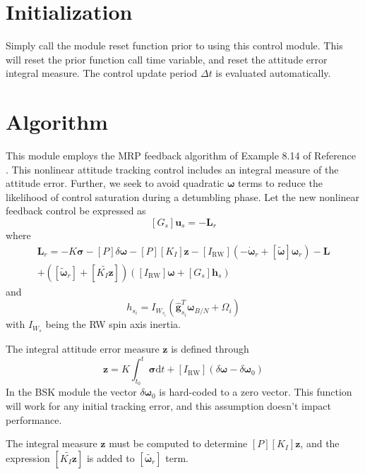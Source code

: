 \documentclass[]{BasiliskReportMemo}
\begin{document}
\section{Initialization}
Simply call the module reset function prior to using this control module.  This will reset the prior function call time variable, and reset the attitude error integral measure.  The control update period $\Delta t$ is evaluated automatically.  

\section{Algorithm}\label{sec:alg}
		 This module employs the MRP feedback algorithm of Example 8.14 of Reference .  This  nonlinear attitude tracking control includes an integral measure of the attitude error.  Further, we seek to avoid quadratic $\bm\omega$ terms to reduce the likelihood of control saturation during a detumbling phase.  Let the new nonlinear feedback control be expressed as
		\begin{equation}
			\label{eq:GusRW}
			[G_{s}]\bm u_{s} = -\bm L_{r} 
		\end{equation}
		where
		\begin{multline}
			\label{eq:Lr}
			\bm L_{r} =  -K \bm\sigma - [P] \delta\bm\omega - [P][K_{I}] \bm z  - [I_{\text{RW}}](-\dot{\bm\omega}_{r} + [\tilde{\bm\omega}]\bm\omega_{r}) - \bm L
			\\
			+ ([\tilde{\bm \omega}_{r}] + [\widetilde{K_{I}\bm z}])
			\left([I_{\text{RW}}]\bm\omega + [G_{s}]\bm h_{s} \right)
		\end{multline}
		and 
		\begin{equation}
			h_{s_{i}} = I_{W_{s_{i}}} (\hat{\bm g}_{s_{i}}^{T} \bm\omega_{B/N} + \Omega_{i})
		\end{equation}
		with $I_{W_{s}}$ being the RW spin axis inertia.

		The integral attitude error measure $\bm z$ is defined through
		\begin{equation*}
			\bm z = K \int_{t_{0}}^{t} \bm\sigma \text{d}t + [I_{\text{RW}}](\delta\bm\omega - \delta\bm\omega_{0})
		\end{equation*}
		In the BSK module the vector $\delta\bm\omega_{0}$ is hard-coded to a zero vector.  This function will work for any initial tracking error, and this assumption doesn't impact performance.
		
		The integral measure $\bm z$ must be computed to determine $[P][K_{I}] \bm z$, and the expression $[\widetilde{K_{I}\bm z}]$ is added to $[\widetilde{\bm\omega_{r}}]$ term.  
\end{document}
